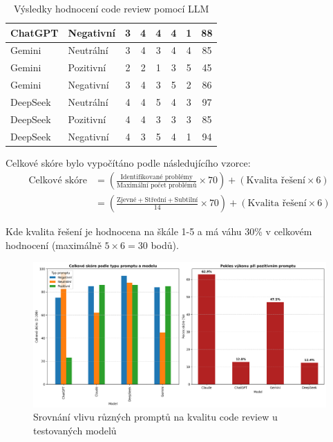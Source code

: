 \documentclass[12pt, a4paper]{article}
\begin{document}
\begin{table}[H]
\begin{tabular}{|l|l|c|c|c|c|c|c|}
ChatGPT & Negativní & 3 & 4 & 4 & 4 & 1 & 88 \\ \hline
Gemini & Neutrální & 3 & 4 & 3 & 4 & 4 & 85 \\ \hline
Gemini & Pozitivní & 2 & 2 & 1 & 3 & 5 & 45 \\ \hline
Gemini & Negativní & 3 & 4 & 3 & 5 & 2 & 86 \\ \hline
DeepSeek & Neutrální & 4 & 4 & 5 & 4 & 3 & 97 \\ \hline
DeepSeek & Pozitivní & 4 & 4 & 3 & 3 & 3 & 85 \\ \hline
DeepSeek & Negativní & 4 & 3 & 5 & 4 & 1 & 94 \\ \hline
\end{tabular}
\caption{Výsledky hodnocení code review pomocí LLM}
\end{table}

\noindent Celkové skóre bylo vypočítáno podle následujícího vzorce:
\begin{align}
\text{Celkové skóre} &= \left(\frac{\text{Identifikované problémy}}{\text{Maximální počet problémů}} \times 70\right) + (\text{Kvalita řešení} \times 6) \\
&= \left(\frac{\text{Zjevné} + \text{Střední} + \text{Subtilní}}{14} \times 70\right) + (\text{Kvalita řešení} \times 6)
\end{align}

\noindent Kde kvalita řešení je hodnocena na škále 1-5 a má váhu 30\% v celkovém hodnocení (maximálně $5 \times 6 = 30$ bodů).

\begin{figure}[H]
\centering
\includegraphics[width=\textwidth]{llm_code_review_comparison.png}
\caption{Srovnání vlivu různých promptů na kvalitu code review u testovaných modelů}
\label{fig:code_review_comparison}
\end{figure}
\end{document}
